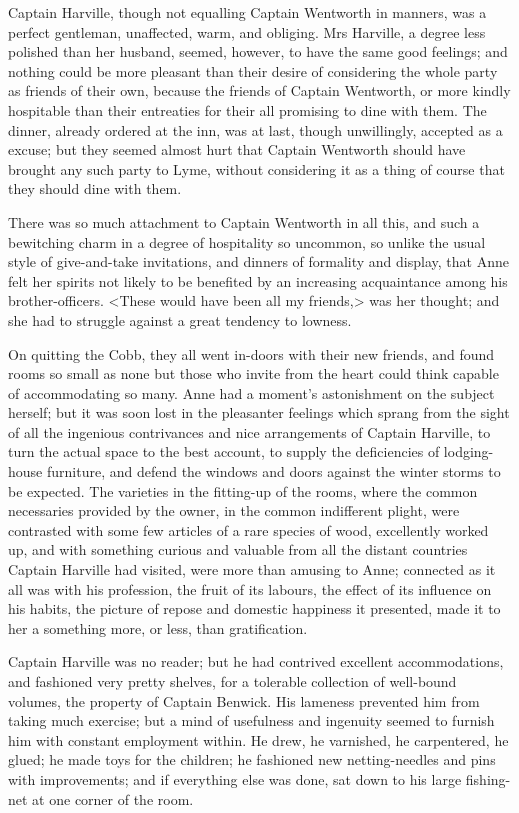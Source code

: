 Captain Harville, though not equalling Captain Wentworth in manners, was a perfect gentleman, unaffected, warm, and obliging. Mrs Harville, a degree less polished than her husband, seemed, however, to have the same good feelings; and nothing could be more pleasant than their desire of considering the whole party as friends of their own, because the friends of Captain Wentworth, or more kindly hospitable than their entreaties for their all promising to dine with them. The dinner, already ordered at the inn, was at last, though unwillingly, accepted as a excuse; but they seemed almost hurt that Captain Wentworth should have brought any such party to Lyme, without considering it as a thing of course that they should dine with them.

There was so much attachment to Captain Wentworth in all this, and such a bewitching charm in a degree of hospitality so uncommon, so unlike the usual style of give-and-take invitations, and dinners of formality and display, that Anne felt her spirits not likely to be benefited by an increasing acquaintance among his brother-officers. <These would have been all my friends,> was her thought; and she had to struggle against a great tendency to lowness.

On quitting the Cobb, they all went in-doors with their new friends, and found rooms so small as none but those who invite from the heart could think capable of accommodating so many. Anne had a moment's astonishment on the subject herself; but it was soon lost in the pleasanter feelings which sprang from the sight of all the ingenious contrivances and nice arrangements of Captain Harville, to turn the actual space to the best account, to supply the deficiencies of lodging-house furniture, and defend the windows and doors against the winter storms to be expected. The varieties in the fitting-up of the rooms, where the common necessaries provided by the owner, in the common indifferent plight, were contrasted with some few articles of a rare species of wood, excellently worked up, and with something curious and valuable from all the distant countries Captain Harville had visited, were more than amusing to Anne; connected as it all was with his profession, the fruit of its labours, the effect of its influence on his habits, the picture of repose and domestic happiness it presented, made it to her a something more, or less, than gratification.

Captain Harville was no reader; but he had contrived excellent accommodations, and fashioned very pretty shelves, for a tolerable collection of well-bound volumes, the property of Captain Benwick. His lameness prevented him from taking much exercise; but a mind of usefulness and ingenuity seemed to furnish him with constant employment within. He drew, he varnished, he carpentered, he glued; he made toys for the children; he fashioned new netting-needles and pins with improvements; and if everything else was done, sat down to his large fishing-net at one corner of the room.

